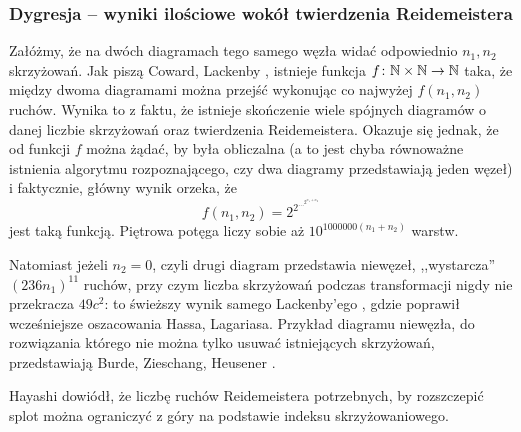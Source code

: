 \subsubsection{Dygresja -- wyniki ilościowe wokół twierdzenia Reidemeistera}
Załóżmy, że na dwóch diagramach tego samego węzła widać odpowiednio $n_1, n_2$ skrzyżowań.
Jak piszą Coward, Lackenby \cite{coward2011}, istnieje funkcja $f \colon \mathbb N \times \mathbb N \to \mathbb N$ taka, że między dwoma diagramami można przejść wykonując co najwyżej $f(n_1, n_2)$ ruchów.
%
%
Wynika to z faktu, że istnieje skończenie wiele spójnych diagramów o danej liczbie skrzyżowań oraz twierdzenia Reidemeistera.
Okazuje się jednak, że od funkcji $f$ można żądać, by była obliczalna
(a to jest chyba równoważne istnienia algorytmu rozpoznającego, czy dwa diagramy przedstawiają jeden węzeł)
i faktycznie, główny wynik \cite{coward2011} orzeka, że
\begin{equation}
    f(n_1, n_2) = 2^{2^{\ldots^{2^{n_1 + n_2}}}}
\end{equation}
jest taką funkcją.
Piętrowa potęga liczy sobie aż $10^{1000000 (n_1 + n_2)}$ warstw.

Natomiast jeżeli $n_2 = 0$, czyli drugi diagram przedstawia niewęzeł, ,,wystarcza'' $(236n_1)^{11}$ ruchów, przy czym liczba skrzyżowań podczas transformacji nigdy nie przekracza $49c^2$: to świeższy wynik samego Lackenby'ego \cite{lackenby2015}, gdzie poprawił wcześniejsze oszacowania Hassa, Lagariasa.
%
Przykład diagramu niewęzła, do rozwiązania którego nie można tylko usuwać istniejących skrzyżowań, przedstawiają Burde, Zieschang, Heusener \cite[s. 12]{burde2014}.

Hayashi \cite{hayashi2005} dowiódł, że liczbę ruchów Reidemeistera potrzebnych, by rozszczepić splot można ograniczyć z góry na podstawie indeksu skrzyżowaniowego.
%



